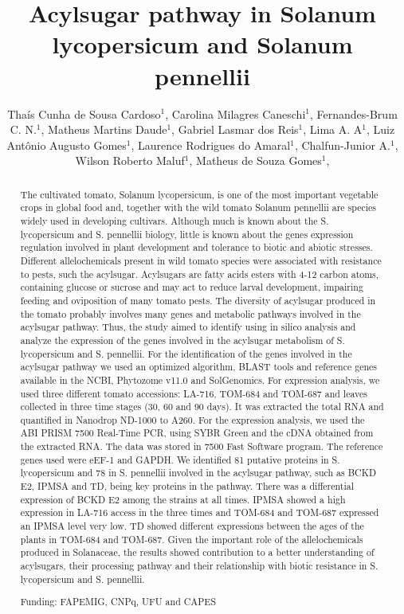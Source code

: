 \documentclass[twoside]{article}
\title{\vspace{-15mm}\fontsize{24pt}{10pt}\selectfont\textbf{ Acylsugar pathway in Solanum lycopersicum and Solanum pennellii }} %
\author{ Thaís Cunha de Sousa Cardoso$^{1}$, Carolina Milagres Caneschi$^{1}$, Fernandes-Brum C. N.$^{1}$, Matheus Martins Daude$^{1}$, Gabriel Lasmar dos Reis$^{1}$, Lima A. A$^{1}$, Luiz Antônio Augusto Gomes$^{1}$, Laurence Rodrigues do Amaral$^{1}$, Chalfun-Junior A.$^{1}$, Wilson Roberto Maluf$^{1}$, Matheus de Souza Gomes$^{1}$, }
\affil{ 1 UFU

 }
\date{}
\begin{document}
  
  
  \maketitle %
  
  
  \thispagestyle{fancy} %
  
  
  \begin{abstract}
  The cultivated tomato, Solanum lycopersicum, is one of the most important vegetable crops in global food and, together with the wild tomato Solanum pennellii are species widely used in developing cultivars. Although much is known about the S. lycopersicum and S. pennellii biology, little is known about the genes expression regulation involved in plant development and tolerance to biotic and abiotic stresses. Different allelochemicals present in wild tomato species were associated with resistance to pests, such the acylsugar. Acylsugars are fatty acids esters with 4-12 carbon atoms, containing glucose or sucrose and may act to reduce larval development, impairing feeding and oviposition of many tomato pests. The diversity of acylsugar produced in the tomato probably involves many genes and metabolic pathways involved in the acylsugar pathway. Thus, the study aimed to identify using in silico analysis and analyze the expression of the genes involved in the acylsugar metabolism of S. lycopersicum and S. pennellii. For the identification of the genes involved in the acylsugar pathway we used an optimized algorithm, BLAST tools and reference genes available in the NCBI, Phytozome v11.0 and SolGenomics. For expression analysis, we used three different tomato accessions: LA-716, TOM-684 and TOM-687 and leaves collected in three time stages (30, 60 and 90 days). It was extracted the total RNA and quantified in Nanodrop\textsuperscript{\textcopyright} ND-1000 to A260. For the expression analysis, we used the ABI PRISM 7500 Real-Time PCR, using SYBR Green and the cDNA obtained from the extracted RNA. The data was stored in 7500 Fast Software program. The reference genes used were eEF-1 and GAPDH. We identified 81 putative proteins in S. lycopersicum and 78 in S. pennellii involved in the acylsugar pathway, such as BCKD E2, IPMSA and TD, being key proteins in the pathway. There was a differential expression of BCKD E2 among the strains at all times. IPMSA showed a high expression in LA-716 access in the three times and TOM-684 and TOM-687 expressed an IPMSA level very low. TD showed different expressions between the ages of the plants in TOM-684 and TOM-687. Given the important role of the allelochemicals produced in Solanaceae, the results showed contribution to a better understanding of acylsugars, their processing pathway and their relationship with biotic resistance in S. lycopersicum and S. pennellii.
  
  Funding: FAPEMIG, CNPq, UFU and CAPES \\ 
  \end{abstract}
  
\end{document}

